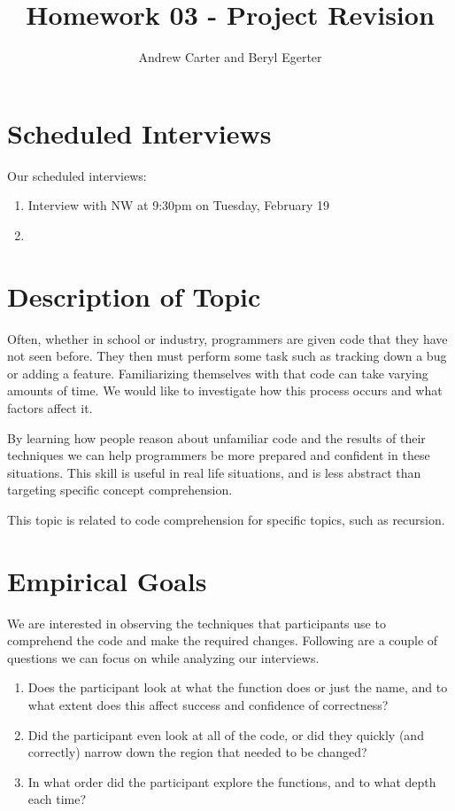 \documentclass{article}
\title{Homework 03 - Project Revision}
\author{Andrew Carter and Beryl Egerter}
\begin{document}
\maketitle
\section{Scheduled Interviews}
Our scheduled interviews:
\begin{enumerate}
  \item Interview with NW at 9:30pm on Tuesday, February 19
  \item
\end{enumerate}
\section{Description of Topic}

Often, whether in school or industry, programmers are given code that they have not seen before.
They then must perform some task such as tracking down a bug or adding a feature.
Familiarizing themselves with that code can take varying amounts of time.
We would like to investigate how this process occurs and what factors affect it.

By learning how people reason about unfamiliar code and the results of their techniques we can help programmers be more prepared and confident in these situations.
This skill is useful in real life situations, and is less abstract than targeting specific concept comprehension.

This topic is related to code comprehension for specific topics, such as recursion.
\section{Empirical Goals}

We are interested in observing the techniques that participants use to comprehend the code and make the required changes. Following are a couple of questions we can focus on while analyzing our interviews.
\begin{enumerate}
	\item Does the participant look at what the function does or just the name, and to what extent does this affect success and confidence of correctness?
	\item Did the participant even look at all of the code, or did they quickly (and correctly) narrow down the region that needed to be changed?
	\item In what order did the participant explore the functions, and to what depth each time?
\end{enumerate}
\end{document}
